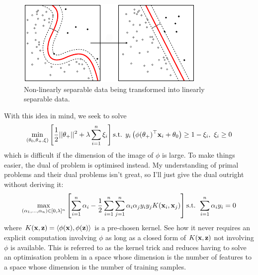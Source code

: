 \documentclass[11pt]{article}
\begin{document}

\begin{figure}[t]
    \centering
    \begin{minipage}{0.55\linewidth}
        \includegraphics[width=\linewidth]{./figures/supervised_learning/SVM_non_linear.pdf}
    \end{minipage}%
    \hfill
    \begin{minipage}{0.4\linewidth}
        \caption{Non-linearly separable data being transformed into linearly separable data.}
        \label{fig:SVM_non_linear}
    \end{minipage}
\end{figure}

With this idea in mind, we seek to solve
$$
\min_{(\theta_0,\theta_+,\xi)}\left[\frac{1}{2}||\theta_+||^2+\lambda\sum_{i=1}^n\xi_i\right]\text{s.t. } y_i\left(\phi(\theta_+)^\top\mathbf{x}_i+\theta_0\right)\geq 1-\xi_i,\text{ }\xi_i\geq0
$$
which is difficult if the dimension of the image of $\phi$ is large. To make things easier, the dual of problem is optimised instead. My understanding of primal problems and their dual problems isn't great, so I'll just give the dual outright without deriving it:
$$
\max_{(\alpha_1,\dots,\alpha_n)\in[0,\lambda]^n}\left[\sum_{i=1}^n\alpha_i-\frac{1}{2}\sum_{i=1}^n\sum_{j=1}^n\alpha_i\alpha_jy_iy_jK(\mathbf{x}_i,\mathbf{x}_j)\right]\text{s.t. }\sum_{i=1}^n\alpha_iy_i=0
$$
where $K(\mathbf{x},\mathbf{z})=\langle\phi(\mathbf{x}),\phi(\mathbf{z})\rangle$ is a pre-chosen kernel. See how it never requires an explicit computation involving $\phi$ as long as a closed form of $K(\mathbf{x},\mathbf{z})$ not involving $\phi$ is available. This is referred to as the kernel trick and reduces having to solve an optimisation problem in a space whose dimension is the number of features to a space whose dimension is the number of training samples.
\end{document}
